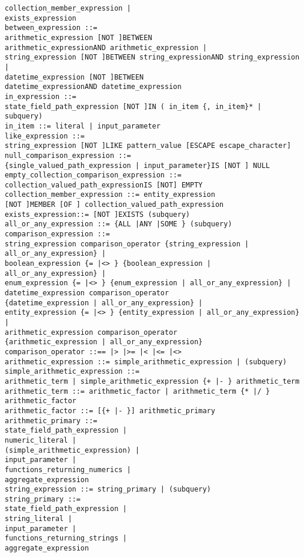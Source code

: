 \documentclass[11pt,a4paper]{report}
\begin{document}
\begin{verbatim}
collection_member_expression |
exists_expression
between_expression ::=
arithmetic_expression [NOT ]BETWEEN
arithmetic_expressionAND arithmetic_expression |
string_expression [NOT ]BETWEEN string_expressionAND string_expression |
datetime_expression [NOT ]BETWEEN
datetime_expressionAND datetime_expression
in_expression ::=
state_field_path_expression [NOT ]IN ( in_item {, in_item}* | subquery)
in_item ::= literal | input_parameter
like_expression ::=
string_expression [NOT ]LIKE pattern_value [ESCAPE escape_character]
null_comparison_expression ::=
{single_valued_path_expression | input_parameter}IS [NOT ] NULL
empty_collection_comparison_expression ::=
collection_valued_path_expressionIS [NOT] EMPTY
collection_member_expression ::= entity_expression
[NOT ]MEMBER [OF ] collection_valued_path_expression
exists_expression::= [NOT ]EXISTS (subquery)
all_or_any_expression ::= {ALL |ANY |SOME } (subquery)
comparison_expression ::=
string_expression comparison_operator {string_expression | all_or_any_expression} |
boolean_expression {= |<> } {boolean_expression | all_or_any_expression} |
enum_expression {= |<> } {enum_expression | all_or_any_expression} |
datetime_expression comparison_operator
{datetime_expression | all_or_any_expression} |
entity_expression {= |<> } {entity_expression | all_or_any_expression} |
arithmetic_expression comparison_operator
{arithmetic_expression | all_or_any_expression}
comparison_operator ::== |> |>= |< |<= |<>
arithmetic_expression ::= simple_arithmetic_expression | (subquery)
simple_arithmetic_expression ::=
arithmetic_term | simple_arithmetic_expression {+ |- } arithmetic_term
arithmetic_term ::= arithmetic_factor | arithmetic_term {* |/ } arithmetic_factor
arithmetic_factor ::= [{+ |- }] arithmetic_primary
arithmetic_primary ::=
state_field_path_expression |
numeric_literal |
(simple_arithmetic_expression) |
input_parameter |
functions_returning_numerics |
aggregate_expression
string_expression ::= string_primary | (subquery)
string_primary ::=
state_field_path_expression |
string_literal |
input_parameter |
functions_returning_strings |
aggregate_expression


\end{verbatim}
\end{document}

